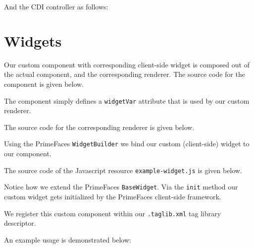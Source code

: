 And the CDI controller as follows:



\section{Widgets}
Our custom component with corresponding client-side widget is composed out of the actual component, and the corresponding renderer.
The source code for the component is given below.

The component simply defines a \texttt{widgetVar} attribute that is used by our custom renderer.

The source code for the corresponding renderer is given below.

Using the PrimeFaces \texttt{WidgetBuilder} we bind our custom (client-side) widget to our component.

The source code of the Javascript resource \texttt{example-widget.js} is given below.

Notice how we extend the PrimeFaces \texttt{BaseWidget}. Via the \texttt{init} method our custom widget gets initialized by the PrimeFaces client-side framework.

We register this custom component within our \texttt{.taglib.xml} tag library descriptor.


An example usage is demonstrated below:
